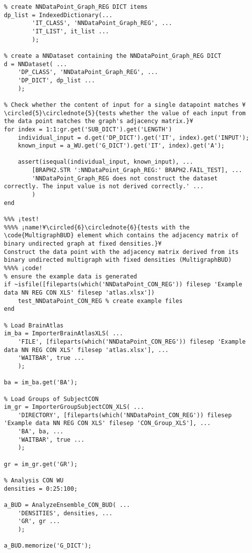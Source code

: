 \documentclass{tufte-handout}
\begin{document}
\begin{lstlisting}
% create NNDataPoint_Graph_REG DICT items
dp_list = IndexedDictionary(...
        'IT_CLASS', 'NNDataPoint_Graph_REG', ...
        'IT_LIST', it_list ...
        );

% create a NNDataset containing the NNDataPoint_Graph_REG DICT
d = NNDataset( ...
    'DP_CLASS', 'NNDataPoint_Graph_REG', ...
    'DP_DICT', dp_list ...
    );

% Check whether the content of input for a single datapoint matches ¥\circled{5}\circlednote{5}{tests whether the value of each input from the data point matches the graph's adjacency matrix.}¥
for index = 1:1:gr.get('SUB_DICT').get('LENGTH')
    individual_input = d.get('DP_DICT').get('IT', index).get('INPUT');
    known_input = a_WU.get('G_DICT').get('IT', index).get('A');

    assert(isequal(individual_input, known_input), ...
        [BRAPH2.STR ':NNDataPoint_Graph_REG:' BRAPH2.FAIL_TEST], ...
        'NNDataPoint_Graph_REG does not construct the dataset correctly. The input value is not derived correctly.' ...
        )
end

%%% ¡test!
%%%% ¡name!¥\circled{6}\circlednote{6}{tests with the \code{MultigraphBUD} element which contains the adjacency matrix of binary undirected graph at fixed densities.}¥
Construct the data point with the adjacency matrix derived from its binary undirected multigraph with fixed densities (MultigraphBUD)
%%%% ¡code!
% ensure the example data is generated
if ~isfile([fileparts(which('NNDataPoint_CON_REG')) filesep 'Example data NN REG CON XLS' filesep 'atlas.xlsx'])
    test_NNDataPoint_CON_REG % create example files
end

% Load BrainAtlas
im_ba = ImporterBrainAtlasXLS( ...
    'FILE', [fileparts(which('NNDataPoint_CON_REG')) filesep 'Example data NN REG CON XLS' filesep 'atlas.xlsx'], ...
    'WAITBAR', true ...
    );

ba = im_ba.get('BA');

% Load Groups of SubjectCON
im_gr = ImporterGroupSubjectCON_XLS( ...
    'DIRECTORY', [fileparts(which('NNDataPoint_CON_REG')) filesep 'Example data NN REG CON XLS' filesep 'CON_Group_XLS'], ...
    'BA', ba, ...
    'WAITBAR', true ...
    );

gr = im_gr.get('GR');

% Analysis CON WU
densities = 0:25:100;

a_BUD = AnalyzeEnsemble_CON_BUD( ...
    'DENSITIES', densities, ...
    'GR', gr ...
    );

a_BUD.memorize('G_DICT');


\end{lstlisting}
\end{document}
